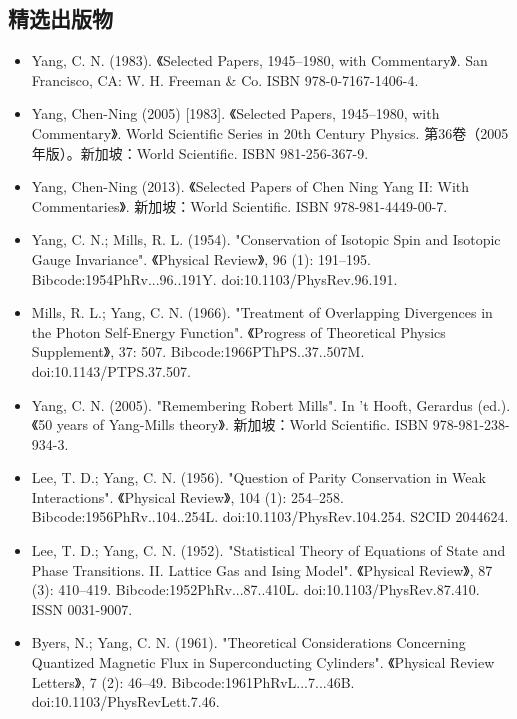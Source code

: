 \subsection{精选出版物}
\begin{itemize}
\item Yang, C. N. (1983). 《Selected Papers, 1945–1980, with Commentary》. San Francisco, CA: W. H. Freeman & Co. ISBN 978-0-7167-1406-4.
\item Yang, Chen-Ning (2005) [1983]. 《Selected Papers, 1945–1980, with Commentary》. World Scientific Series in 20th Century Physics. 第36卷（2005年版）。新加坡：World Scientific. ISBN 981-256-367-9.
\item Yang, Chen-Ning (2013). 《Selected Papers of Chen Ning Yang II: With Commentaries》. 新加坡：World Scientific. ISBN 978-981-4449-00-7.
\item Yang, C. N.; Mills, R. L. (1954). "Conservation of Isotopic Spin and Isotopic Gauge Invariance". 《Physical Review》, 96 (1): 191–195. Bibcode:1954PhRv...96..191Y. doi:10.1103/PhysRev.96.191.
\item Mills, R. L.; Yang, C. N. (1966). "Treatment of Overlapping Divergences in the Photon Self-Energy Function". 《Progress of Theoretical Physics Supplement》, 37: 507. Bibcode:1966PThPS..37..507M. doi:10.1143/PTPS.37.507.
\item Yang, C. N. (2005). "Remembering Robert Mills". In 't Hooft, Gerardus (ed.). 《50 years of Yang-Mills theory》. 新加坡：World Scientific. ISBN 978-981-238-934-3.
\item Lee, T. D.; Yang, C. N. (1956). "Question of Parity Conservation in Weak Interactions". 《Physical Review》, 104 (1): 254–258. Bibcode:1956PhRv..104..254L. doi:10.1103/PhysRev.104.254. S2CID 2044624.
\item Lee, T. D.; Yang, C. N. (1952). "Statistical Theory of Equations of State and Phase Transitions. II. Lattice Gas and Ising Model". 《Physical Review》, 87 (3): 410–419. Bibcode:1952PhRv...87..410L. doi:10.1103/PhysRev.87.410. ISSN 0031-9007.
\item Byers, N.; Yang, C. N. (1961). "Theoretical Considerations Concerning Quantized Magnetic Flux in Superconducting Cylinders". 《Physical Review Letters》, 7 (2): 46–49. Bibcode:1961PhRvL...7...46B. doi:10.1103/PhysRevLett.7.46.
\end{itemize}